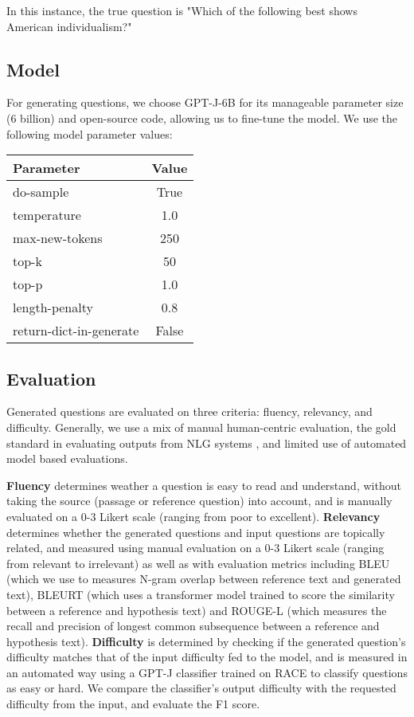 \documentclass[11pt]{article}
\begin{document}
In this instance, the true question is "Which of the following best shows American individualism?"

\subsection{Model}

For generating questions, we choose GPT-J-6B \citep{gpt-j:4} for its manageable parameter size (6 billion) and open-source code, allowing us to fine-tune the model. We use the following model parameter values: 

\begin{table}[h]
\centering
\begin{tabular}{lc}
\hline
\textbf{Parameter} & \textbf{Value}\\
\hline
do-sample & True \\
temperature & 1.0 \\
max-new-tokens & 250 \\
top-k & 50 \\ 
top-p & 1.0  \\ 
length-penalty & 0.8 \\
return-dict-in-generate & False \\
\hline
\end{tabular}
\end{table}


\subsection{Evaluation}

Generated questions are evaluated on three criteria: fluency, relevancy, and difficulty. Generally, we use a mix of manual human-centric evaluation, the gold standard in evaluating outputs from NLG systems \citep{human-eval:7}, and limited use of automated model based evaluations.

\textbf{Fluency} determines weather a question is easy to read and understand, without taking the source (passage or reference question) into account, and is manually evaluated on a 0-3 Likert scale (ranging from poor to excellent). \textbf{Relevancy} \cite{relevancy:5} determines whether the generated questions and input questions are topically related, and measured using manual evaluation on a 0-3 Likert scale (ranging from relevant to irrelevant) as well as with evaluation metrics including BLEU (which we use to measures N-gram overlap between reference text and generated text), BLEURT (which uses a transformer model trained to score the similarity between a reference and hypothesis text) and ROUGE-L (which measures the recall and precision of longest common subsequence between a reference and hypothesis
text). \textbf{Difficulty} is determined by checking if the generated question’s difficulty matches that of the input difficulty fed to the model, and is measured in an automated way using a GPT-J classifier trained on RACE to classify questions as easy or hard. We compare the classifier's output difficulty with the requested difficulty from the input, and evaluate the F1 score.  
\end{document}
